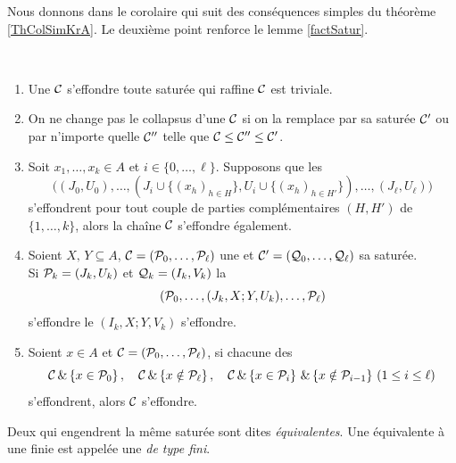 Nous donnons dans le corolaire qui suit des conséquences simples du 
théorème \ref{ThColSimKrA}. Le deuxième point renforce le lemme \ref{factSatur}. 
\begin{corollary} 
\label{corColSimKrA}~
\begin{enumerate}
\item  Une \proc ${\cal C}$  s'effondre \ssi toute \proc saturée qui raffine 
${\cal C}$ est triviale.
\item  On ne change pas le collapsus d'une \proc ${\cal C}$ si on la remplace par sa saturée ${\cal C}'$ ou par n'importe quelle \proc
 ${\cal C}''$ telle que ${\cal C}\leq {\cal C}''\leq {\cal C}'$.
\item  Soit $x_1,\ldots,x_k\in A$ et $i\in\{0,\dots,\ell\}$. Supposons que les \procs 
$$\big((J_0,U_0),\ldots,(J_i\cup\{(x_h)_{h\in H}\}, 
U_i\cup\{(x_h)_{h\in H'}\}), \ldots,(J_\ell,U_\ell)\big)
$$
s'effondrent pour tout couple de parties 
complémentaires $(H,H')$ de $\{1,\ldots,k\}$, 
alors la chaîne  ${\cal C}$ s'effondre également.
\item  Soient $X,\,Y\subseteq A$, ${\cal C}=({\cal P}_0,\ldots,{\cal P}_\ell)$ une \proc et   
${\cal C}'=({\cal Q}_0,\ldots,{\cal Q}_\ell)$ sa saturée. \\
Si ${\cal P}_k=(J_k,U_k)$ 
et
 ${\cal Q}_k=(I_k,V_k)$  la \proc 
$$({\cal P}_0,\ldots,(J_k,X;Y,U_k),\ldots,{\cal P}_\ell)$$
s'effondre \ssi le \proi
$(I_k,X;Y,V_k)$ s'effondre.
\item  Soient $x\in A$ et ${\cal C}=({\cal P}_0,\ldots,{\cal P}_\ell)$,  si chacune des 
\procs 
$$
{\cal C}\,\&\left\{{x\in{\cal P}_0}\right\},\quad  
{\cal C}\,\&\left\{{x\notin{\cal P}_\ell}\right\},\quad  
{\cal C}\,\&\left\{{x\in{\cal P}_i}\right\}\,\&\left\{{x\notin{\cal P}_{i-1}}\right\} \,(1\leq i\leq \ell)
$$
s'effondrent, alors ${\cal C}$ s'effondre.
\end{enumerate}
\end{corollary}
\begin{definition}{\rm  
\label{defproch3} 
 Deux \procs qui engendrent la même \proc saturée sont dites 
{\em équivalentes}.
 Une \proc équivalente à une \proc finie est appelée une {\em 
\proc de type fini}.
}
\end{definition}


